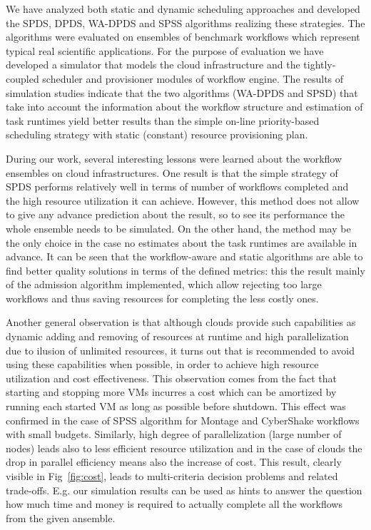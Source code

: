 \documentclass{sig-alternate}
\begin{document}
We have analyzed both static and dynamic scheduling approaches and
developed the SPDS, DPDS, WA-DPDS and SPSS algorithms realizing these
strategies. The algorithms were evaluated on ensembles of benchmark
workflows which represent typical real scientific applications. For the
purpose of evaluation we have developed a simulator that models the cloud
infrastructure and the tightly-coupled scheduler and provisioner modules of
workflow engine. The results of simulation studies indicate that the two algorithms (WA-DPDS and
SPSD) that take into account the information about the workflow structure and
estimation of task runtimes yield better results than the simple on-line
priority-based scheduling strategy with static (constant) resource provisioning
plan. 

During our work, several interesting lessons were learned about the workflow
ensembles on cloud infrastructures. One result is that the simple strategy of
SPDS performs relatively well in terms of number of workflows completed and the
high resource utilization it can achieve. However, this method does not allow to
give any advance prediction about the result, so to see its performance the
whole ensemble needs to be simulated. On the other hand, the method may be
the only choice in the case no estimates about the task runtimes are available
in advance. It can be seen that the workflow-aware and static algorithms are
able to find better quality solutions in terms of the defined metrics: this the
result mainly of the admission algorithm implemented, which allow rejecting too
large workflows and thus saving resources for completing the less costly ones.

Another general observation is that although clouds provide such capabilities as
dynamic adding and removing of resources at runtime and high parallelization due
to ilusion of unlimited resources, it turns out that is recommended to avoid
using these capabilities when possible, in order to achieve high resource
utilization and cost effectiveness. This observation comes from the fact that
starting and stopping more VMs incurres a cost which can be amortized by running
each started VM as long as possible before shutdown. This effect was confirmed
in the case of SPSS algorithm for Montage and CyberShake workflows with small
budgets. Similarly, high degree of parallelization (large number of nodes) leads
also to less efficient resource utilization and in the case of clouds the drop
in parallel efficiency means also the increase of cost. This result, clearly
visible in Fig~\ref{fig:cost}, leads to multi-criteria decision problems and
related trade-offs. E.g. our simulation results can be used as hints to answer
the question how much time and money is required to actually complete all the
workflows from the given ansemble.
\end{document}
